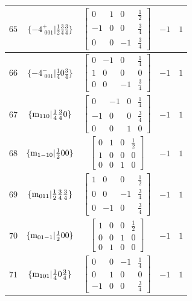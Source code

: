 \documentclass[fleqn,8pt]{jsarticle}
\begin{document}
\begin{longtable}{ccccc}
$ 65 $ & $ \{-4^{+}_{\,\,001}|\frac{1}{2} \frac{3}{4} \frac{3}{4}\} $ & $ \begin{bmatrix} 0 & 1 & 0 & \frac{1}{2} \\ -1 & 0 & 0 & \frac{3}{4} \\ 0 & 0 & -1 & \frac{3}{4} \end{bmatrix} $ & $ -1 $ & $ 1 $ \\ \hline
$ 66 $ & $ \{-4^{-}_{\,\,001}|\frac{1}{4} 0 \frac{3}{4}\} $ & $ \begin{bmatrix} 0 & -1 & 0 & \frac{1}{4} \\ 1 & 0 & 0 & 0 \\ 0 & 0 & -1 & \frac{3}{4} \end{bmatrix} $ & $ -1 $ & $ 1 $ \\ \hline
$ 67 $ & $ \{{\rm m}_{110}|\frac{1}{4} \frac{3}{4} 0\} $ & $ \begin{bmatrix} 0 & -1 & 0 & \frac{1}{4} \\ -1 & 0 & 0 & \frac{3}{4} \\ 0 & 0 & 1 & 0 \end{bmatrix} $ & $ -1 $ & $ 1 $ \\ \hline
$ 68 $ & $ \{{\rm m}_{1-10}|\frac{1}{2} 0 0\} $ & $ \begin{bmatrix} 0 & 1 & 0 & \frac{1}{2} \\ 1 & 0 & 0 & 0 \\ 0 & 0 & 1 & 0 \end{bmatrix} $ & $ -1 $ & $ 1 $ \\ \hline
$ 69 $ & $ \{{\rm m}_{011}|\frac{1}{2} \frac{3}{4} \frac{3}{4}\} $ & $ \begin{bmatrix} 1 & 0 & 0 & \frac{1}{2} \\ 0 & 0 & -1 & \frac{3}{4} \\ 0 & -1 & 0 & \frac{3}{4} \end{bmatrix} $ & $ -1 $ & $ 1 $ \\ \hline
$ 70 $ & $ \{{\rm m}_{01-1}|\frac{1}{2} 0 0\} $ & $ \begin{bmatrix} 1 & 0 & 0 & \frac{1}{2} \\ 0 & 0 & 1 & 0 \\ 0 & 1 & 0 & 0 \end{bmatrix} $ & $ -1 $ & $ 1 $ \\ \hline
$ 71 $ & $ \{{\rm m}_{101}|\frac{1}{4} 0 \frac{3}{4}\} $ & $ \begin{bmatrix} 0 & 0 & -1 & \frac{1}{4} \\ 0 & 1 & 0 & 0 \\ -1 & 0 & 0 & \frac{3}{4} \end{bmatrix} $ & $ -1 $ & $ 1 $ \\ \hline

\end{longtable}
\end{document}
